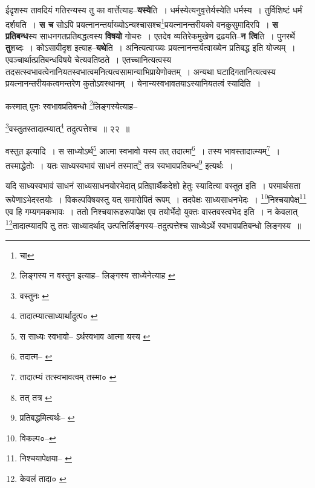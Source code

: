 \documentclass[article,12pt,a4paper]{memoir}
\begin{document}
	  \pstart ईदृशस्य तावदियं गतिरन्यस्य तु का वार्त्तेत्याह--\textbf{यस्ये}ति । धर्मस्येत्यनुवृत्तेर्यस्येति धर्मस्य । तुर्विशिष्टं धर्मं दर्शयति । \textbf{स च} सोऽपि प्रयत्नानन्तर्याख्योऽन्यश्चासश्च\footnote{चा}प्रयत्नानन्तरीयको वनकुसुमादिरपि । \textbf{स प्रतिबन्ध}स्य साधनगतप्रतिबद्धत्वस्य \textbf{विषयो} गोचरः । एतदेव व्यतिरेकमुखेण द्रढयति--\textbf{न त्वि}ति । पुनरर्थे \textbf{तु}शब्दः । कोऽसावीदृश इत्याह--\textbf{यथे}ति । अनित्यत्वाख्यः प्रयत्नानन्तर्यत्वाख्येन प्रतिबद्ध इति योज्यम् । एवञ्चार्थात्प्रतिबन्धविषये चेत्यव\leavevmode{}तिष्ठते । एतच्चानित्यत्वस्य तदसत्स्वभावत्वेनानियतस्वभात्वमनित्यत्वसामान्याभिप्रायेणोक्तम् । अन्यथा घटादिगतानित्यत्वस्य प्रयत्नानन्तरीयकत्वमन्तरेण कुतोऽवस्थानम् । येनान्यस्वभावतयाऽस्यानियतत्वं स्यादिति ।
	\pend
	  \bigskip
	  \begingroup
	

	  \pstart कस्मात् पुनः स्वभावप्रतिबन्धो \footnote{लिङ्गस्य न वस्तुन इत्याह--\cite{dp-msB} \cite{dp-msD} \cite{dp-edH} लिङ्गस्य साध्येनेत्याह \cite{dp-edN}}\-लिङ्गस्येत्याह--
	\pend
       
	  \bigskip
	  \begingroup
	

	  \pstart \footnote{वस्तुनः \cite{dp-edP}}\-वस्तुतस्तादात्म्यात्\footnote{तादात्म्यात्साध्यार्थादुत्प० \cite{dp-msB} \cite{dp-edP} \cite{dp-edH} \cite{dp-edE} \cite{dp-edN}} तदुत्पत्तेश्च ॥ २२ ॥
	\pend
      
	  \endgroup
	 

	  \pstart वस्तुत इत्यादि । स साध्योऽर्थ\footnote{स साध्यः स्वभावो--\cite{dp-msB} ऽर्थस्वभाव आत्मा यस्य \cite{dp-msD}} आत्मा स्वभावो यस्य तत् तदात्मा\footnote{तदात्म--\cite{dp-msC} \cite{dp-msD}} । तस्य भावस्तादात्म्यम्\footnote{तादात्म्यं तत्स्वभावत्वम् तस्मा० \cite{dp-msB}} । तस्माद्धेतोः । यतः साध्यस्वभावं साधनं तस्मात्\footnote{तत् तत्र \cite{dp-msB} \cite{dp-edN} \cite{dp-edH}} तत्र स्वभावप्रतिबन्ध\footnote{प्रतिबद्धमित्यर्थः--\cite{dp-msA} \cite{dp-msB} \cite{dp-edP} \cite{dp-edH} \cite{dp-edE} \cite{dp-edN}} इत्यर्थः ।
	\pend
       

	  \pstart यदि साध्यस्वभावं साधनं साध्यसाधनयोरभेदात् प्रतिज्ञार्थैकदेशो हेतुः स्यादित्या वस्तुत इति । परमार्थसता रूपेणाऽभेदस्तयोः । विकल्पविषयस्तु यत् समारोपितं रूपम् । तदपेक्षः साध्यसाधनभेदः । \footnote{विकल्प०--\cite{dp-msD-n}}\-निश्चयापेक्ष\footnote{निश्चयापेक्षया--\cite{dp-msB} \cite{dp-msC} \cite{dp-msD}} एव हि गम्यगमकभावः । ततो निश्चयारूढरूपापेक्ष एव तयोर्भेदो युक्तः वास्तवस्त्वभेद इति । न केवलात् \footnote{केवलं तादा० \cite{dp-msA} \cite{dp-msB} \cite{dp-msD} \cite{dp-edP} \cite{dp-edH} \cite{dp-edE} \cite{dp-edN}}\-तादात्म्यादपि तु ततः साध्यादर्थाद् उत्पत्तिर्लिङ्गस्य--तदुत्पत्तेश्च साध्येऽर्थे स्वभावप्रतिबन्धो लिङ्गस्य ॥
	\pend
      
\end{document}
